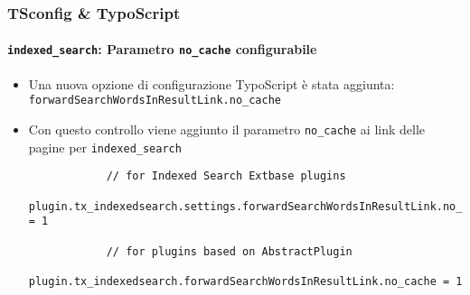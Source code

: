\begin{frame}[fragile]
	\frametitle{TSconfig \& TypoScript}
	\framesubtitle{\texttt{indexed\_search}: Parametro \texttt{no\_cache} configurabile}

	\lstset{basicstyle=\tiny\ttfamily}

	\begin{itemize}

		\item Una nuova opzione di configurazione TypoScript è stata aggiunta:\newline
			 \texttt{forwardSearchWordsInResultLink.no\_cache}

		\item Con questo controllo viene aggiunto il parametro \texttt{no\_cache} ai link delle pagine
			per \texttt{indexed\_search}

		\begin{lstlisting}
			// for Indexed Search Extbase plugins
			plugin.tx_indexedsearch.settings.forwardSearchWordsInResultLink.no_cache = 1

			// for plugins based on AbstractPlugin
			plugin.tx_indexedsearch.forwardSearchWordsInResultLink.no_cache = 1
		\end{lstlisting}

	\end{itemize}

\end{frame}

